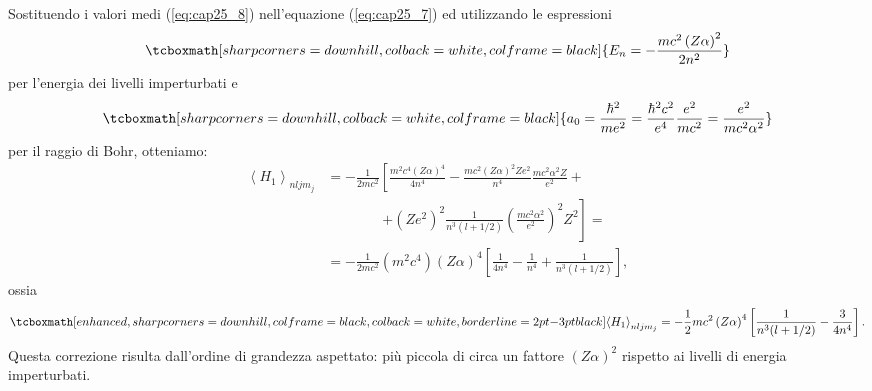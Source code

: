 \documentclass[a4paper,12pt,oneside]{book}
\begin{document}
Sostituendo i valori medi (\ref{eq:cap25_8}) nell'equazione (\ref{eq:cap25_7}) ed utilizzando le espressioni
	\begin{equation} 
		\tcboxmath[sharp corners=downhill, colback=white, colframe=black]{
			E_n=-\frac{mc^2 \left(Z\alpha\right)^2}{2n^2} 
			}
\end{equation}
per l'energia dei livelli imperturbati e 
	\begin{equation} 
		\tcboxmath[sharp corners=downhill, colback=white, colframe=black]{
			a_0=\frac{\hbar^2}{me^2}=\frac{\hbar^2c^2}{e^4}\frac{e^2}{mc^2}=\frac{e^2}{mc^2\alpha^2}
			}
	\end{equation}
per il raggio di Bohr, otteniamo:
	\begin{align} 
		\left\langle H_1 \right\rangle _{nljm_j} & = -\frac{1}{2mc^2} \left[ \frac{m^2c^4 \left( Z \alpha \right)^4}{4n^4}-\frac{mc^2 \left( Z \alpha \right)^2 Z e^2}{n^4} \frac{mc^2\alpha^2 Z}{e^2}+ \right. \nonumber \\
		& \qquad \qquad   \left. + \left( Z e^2 \right)^2 \frac{1}{n^3(l+1/2)} \left(\frac{mc^2\alpha^2}{e^2} \right)^2 Z^2 \right] = \nonumber  \\
		& =  -\frac{1}{2mc^2} \left( m^2c^4 \right) \left( Z \alpha\right)^4 \left[ \frac{1}{4n^4}-\frac{1}{n^4}+\frac{1}{n^3(l+1/2)}  \right] ,
	\end{align}
ossia
	\begin{equation}
	\label{eq:cap25_9}
		\tcboxmath[enhanced, sharp corners=downhill, colframe=black, colback=white, borderline={2pt}{-3pt}{black}]{	
			\left< H_1 \right>_{nljm_j} = -\frac{1}{2}mc^2 \left( Z \alpha \right)^4 \left[ \frac{1}{n^3(l+1/2)}-\frac{3}{4n^4}\right]  .
			}
	\end{equation}
Questa correzione risulta dall'ordine di grandezza aspettato: più piccola di circa un fattore $\left(Z \alpha \right)^2$ rispetto ai livelli di energia imperturbati. \\
\end{document}
